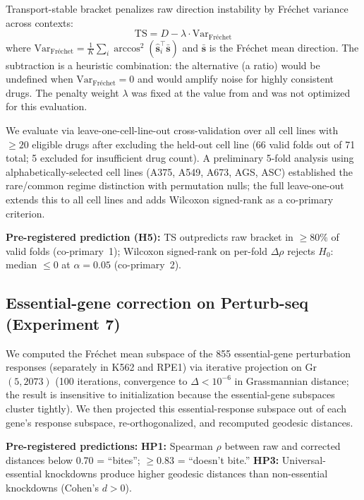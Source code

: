\documentclass[10pt]{article}
\begin{document}
Transport-stable bracket penalizes raw direction instability by Fr\'{e}chet
variance across contexts:
\begin{equation}
  \text{TS} = D - \lambda \cdot \text{Var}_{\text{Fr\'echet}}
  \label{eq:ts}
\end{equation}
where $\text{Var}_{\text{Fr\'echet}} = \frac{1}{K}\sum_i
\arccos^2(\hat{\mathbf{s}}_i^\top \bar{\mathbf{s}})$ and
$\bar{\mathbf{s}}$ is the Fr\'echet mean direction. The subtraction is a
heuristic combination: the alternative (a ratio) would be undefined when
$\text{Var}_{\text{Fr\'echet}} = 0$ and would amplify noise for highly
consistent drugs. The penalty weight $\lambda$ was fixed at the value from
\citet{tower2026drug} and was not optimized for this evaluation.

We evaluate via leave-one-cell-line-out cross-validation over all cell
lines with $\geq 20$ eligible drugs after excluding the held-out cell line
(66 valid folds out of 71 total; 5 excluded for insufficient drug count).
A preliminary 5-fold analysis using alphabetically-selected cell lines
(A375, A549, A673, AGS, ASC) established the rare/common regime distinction
with permutation nulls; the full leave-one-out extends this to all cell
lines and adds Wilcoxon signed-rank as a co-primary criterion.

\textbf{Pre-registered prediction (H5):} TS outpredicts raw bracket
in $\geq 80\%$ of valid folds (co-primary~1); Wilcoxon signed-rank on
per-fold $\Delta\rho$ rejects $H_0$: median $\leq 0$ at $\alpha = 0.05$
(co-primary~2).

\subsection{Essential-gene correction on Perturb-seq (Experiment 7)}

We computed the Fr\'echet mean subspace of the 855 essential-gene
perturbation responses (separately in K562 and RPE1) via iterative
projection on Gr$(5, 2073)$ (100 iterations, convergence to
$\Delta < 10^{-6}$ in Grassmannian distance; the result is insensitive
to initialization because the essential-gene subspaces cluster tightly).
We then projected this essential-response subspace out of each gene's
response subspace, re-orthogonalized, and recomputed geodesic distances.

\textbf{Pre-registered predictions:}
\textbf{HP1:} Spearman $\rho$ between raw and corrected distances below
0.70 = ``bites''; $\geq 0.83$ = ``doesn't bite.''
\textbf{HP3:} Universal-essential knockdowns produce higher geodesic
distances than non-essential knockdowns (Cohen's $d > 0$).
\end{document}
